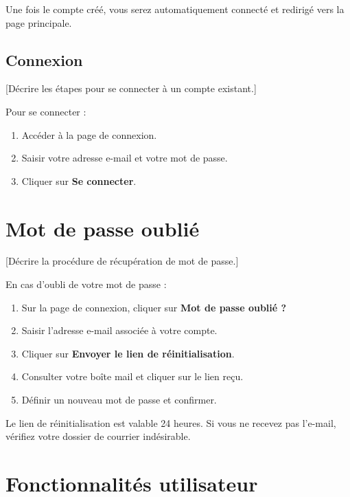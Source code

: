 \documentclass[12pt, a4paper]{article}
\begin{document}
\begin{remarque}
  Une fois le compte créé, vous serez automatiquement connecté et redirigé
  vers la page principale.
\end{remarque}

\subsection{Connexion}

[Décrire les étapes pour se connecter à un compte existant.]

Pour se connecter :
\begin{enumerate}
  \item Accéder à la page de connexion.
  \item Saisir votre adresse e-mail et votre mot de passe.
  \item Cliquer sur \textbf{Se connecter}.
\end{enumerate}

\section{Mot de passe oublié}

[Décrire la procédure de récupération de mot de passe.]

En cas d'oubli de votre mot de passe :
\begin{enumerate}
  \item Sur la page de connexion, cliquer sur \textbf{Mot de passe oublié ?}
  \item Saisir l'adresse e-mail associée à votre compte.
  \item Cliquer sur \textbf{Envoyer le lien de réinitialisation}.
  \item Consulter votre boîte mail et cliquer sur le lien reçu.
  \item Définir un nouveau mot de passe et confirmer.
\end{enumerate}

\begin{remarque}
  Le lien de réinitialisation est valable 24 heures. Si vous ne recevez pas
  l'e-mail, vérifiez votre dossier de courrier indésirable.
\end{remarque}

\section{Fonctionnalités utilisateur}
\end{document}
